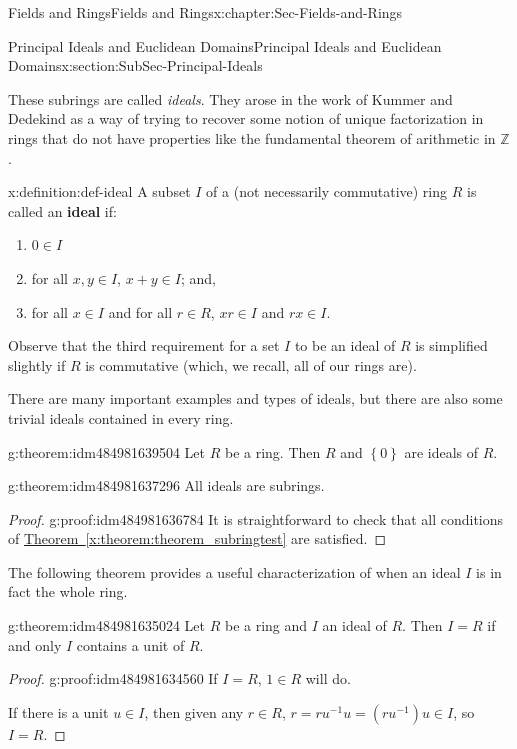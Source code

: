 \documentclass[oneside,10pt,]{book}
\newcommand{\xreffont}{\relax}
\newcommand{\terminology}[1]{\textbf{#1}}
\numberwithin{equation}{section}
\newcommand{\set}[1]{\left\{ {#1} \right\}}
\def\Z{{\mathbb Z}}
\begin{document}
\begin{chapterptx}{Fields and Rings}{}{Fields and Rings}{}{}{x:chapter:Sec-Fields-and-Rings}
\begin{sectionptx}{Principal Ideals and Euclidean Domains}{}{Principal Ideals and Euclidean Domains}{}{}{x:section:SubSec-Principal-Ideals}
\par
These subrings are called \emph{ideals}. They arose in the work of Kummer and Dedekind as a way of trying to recover some notion of unique factorization in rings that do not have properties like the fundamental theorem of arithmetic in \(\Z\).%
\begin{definition}{}{x:definition:def-ideal}%
A subset \(I\) of a (not necessarily commutative) ring \(R\) is called an \terminology{ideal} if:%
\begin{enumerate}
\item{}\(0\in I\)%
\item{}for all \(x,y\in I\), \(x+y\in I\); and,%
\item{}for all \(x\in I\) and for all \(r\in R\), \(xr\in I\) and \(rx\in I\).%
\end{enumerate}
%
\end{definition}
Observe that the third requirement for a set \(I\) to be an ideal of \(R\) is simplified slightly if \(R\) is commutative (which, we recall, all of our rings are).%
\par
There are many important examples and types of ideals, but there are also some trivial ideals contained in every ring.%
\begin{theorem}{}{}{g:theorem:idm484981639504}%
Let \(R\) be a ring. Then \(R\) and \(\set{0}\) are ideals of \(R\).%
\end{theorem}
\begin{theorem}{}{}{g:theorem:idm484981637296}%
All ideals are subrings.%
\end{theorem}
\begin{proof}{}{g:proof:idm484981636784}
It is straightforward to check that all conditions of \hyperref[x:theorem:theorem_subringtest]{Theorem~{\xreffont\ref{x:theorem:theorem_subringtest}}} are satisfied.%
\end{proof}
The following theorem provides a useful characterization of when an ideal \(I\) is in fact the whole ring.%
\begin{theorem}{}{}{g:theorem:idm484981635024}%
Let \(R\) be a ring and \(I\) an ideal of \(R\). Then \(I = R\) if and only \(I\) contains a unit of \(R\).%
\end{theorem}
\begin{proof}{}{g:proof:idm484981634560}
If \(I = R\), \(1\in R\) will do.%
\par
If there is a unit \(u\in I\), then given any \(r\in R\), \(r = r u^{-1} u = (ru^{-1}) u \in I\), so \(I = R\).%
\end{proof}

\end{sectionptx}
\end{chapterptx}
\end{document}
